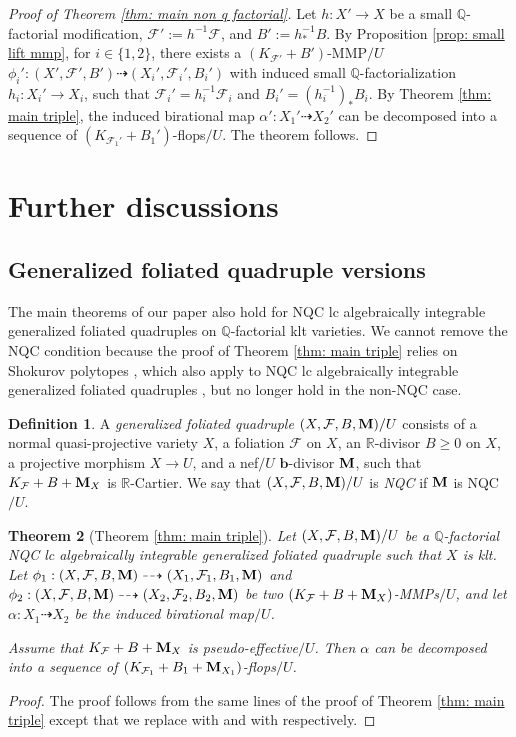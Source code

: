 \documentclass[11pt]{amsart}
\numberwithin{equation}{section}
\newcommand{\bb}{\bm{b}}
\newcommand{\Mm}{{\bf{M}}}
\newcommand{\Qq}{\mathbb{Q}}
\newcommand{\Rr}{\mathbb{R}}
\newcommand{\Ff}{\mathcal{F}}
\newtheorem{thm}{Theorem}[section]
\theoremstyle{definition}
\newtheorem{defn}[thm]{Definition}
\theoremstyle{definition}
\theoremstyle{definition}
\begin{document}
\begin{proof}[Proof of Theorem \ref{thm: main non q factorial}]
Let $h: X'\rightarrow X$ be a small $\Qq$-factorial modification, $\Ff':=h^{-1}\Ff$, and $B':=h^{-1}_*B$. By Proposition \ref{prop: small lift mmp}, for $i\in\{1,2\}$, there exists a $(K_{\Ff'}+B')$-MMP$/U$ $\phi_i': (X',\Ff',B')\dashrightarrow (X_i',\Ff_i',B_i')$ with induced small $\Qq$-factorialization $h_i: X_i'\rightarrow X_i$, such that $\Ff_i'=h_i^{-1}\Ff_i$ and $B_i'=(h_i^{-1})_*B_i$. By Theorem \ref{thm: main triple}, the induced birational map $\alpha': X_1'\dashrightarrow X_2'$ can be decomposed into a sequence of $(K_{\Ff_1'}+B_1')$-flops$/U$. The theorem follows.
\end{proof}


\section{Further discussions}\label{sec: further discussion}

\subsection{Generalized foliated quadruple versions}

The main theorems of our paper also hold for NQC lc algebraically integrable generalized foliated quadruples on $\Qq$-factorial klt varieties. We cannot remove the NQC condition because the proof of Theorem \ref{thm: main triple} relies on Shokurov polytopes \cite[Theorems 1.12]{LMX24b}, which also apply to NQC lc algebraically integrable generalized foliated quadruples \cite[Theorem A.14]{LMX24b}, but no longer hold in the non-NQC case.

\begin{defn}
A \emph{generalized foliated quadruple} $(X,\Ff,B,\Mm)/U$ consists of a normal quasi-projective variety $X$, a foliation $\Ff$ on $X$, an $\Rr$-divisor $B\geq 0$ on $X$, a projective morphism $X\rightarrow U$, and a nef$/U$ $\bb$-divisor $\Mm$, such that $K_{\Ff}+B+\Mm_X$ is $\mathbb R$-Cartier. We say that $(X,\Ff,B,\Mm)/U$ is \emph{NQC} if $\Mm$ is NQC$/U$. 
\end{defn}


\begin{thm}[Theorem \ref{thm: main triple}]\label{thm: main triple gfq}
Let $(X,\Ff,B,\Mm)/U$ be a $\Qq$-factorial NQC lc algebraically integrable generalized foliated quadruple such that $X$ is klt. Let $\phi_1: (X,\Ff,B,\Mm)\dashrightarrow (X_1,\Ff_1,B_1,\Mm)$ and $\phi_2: (X,\Ff,B,\Mm)\dashrightarrow (X_2,\Ff_2,B_2,\Mm)$ be two $(K_{\Ff}+B+\Mm_X)$-MMPs$/U$, and let $\alpha: X_1\dashrightarrow X_2$ be the induced birational map$/U$.

Assume that $K_{\Ff}+B+\Mm_X$ is pseudo-effective$/U$. Then $\alpha$ can be decomposed into a sequence of $(K_{\Ff_1}+B_1+\Mm_{X_1})$-flops$/U$.
\end{thm}
\begin{proof}
    The proof follows from the same lines of the proof of Theorem \ref{thm: main triple} except that we replace \cite[Lemma 4.13]{LMX24b} with \cite[Lemma A.29]{LMX24b} and \cite[Theorem 1.12]{LMX24b} with \cite[Theorem A.14]{LMX24b} respectively.
\end{proof}
\end{document}
